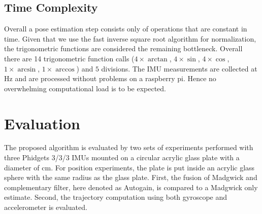 \documentclass[letterpaper, 10 pt, conference]{ieeeconf}  %
\begin{document}
\subsection{Time Complexity}

Overall a pose estimation step consists only of operations that are constant in time. 
Given that we use the fast inverse square root algorithm \cite{FastInvSqrt} for normalization, the trigonometric functions are considered the remaining bottleneck.
Overall there are 14 trigonometric function calls ($4\times \arctan$, $4\times\sin$, $4\times\cos$, $1\times \arcsin$, $1\times\arccos$) and $5$ divisions. 
The IMU measurements are collected at \unit[125]{Hz} and are processed without problems on a raspberry pi.
Hence no overwhelming computational load is to be expected.

 
 

\section{Evaluation}
The proposed algorithm is evaluated by two sets of experiments performed with three Phidgets 3/3/3 IMUs mounted on a circular acrylic glass plate with a diameter of \unit[29]{cm}.
For position experiments, the plate is put inside an acrylic glass sphere with the same radius as the glass plate.
First, the fusion of Madgwick and complementary filter, here denoted as Autogain, is compared to a Madgwick only estimate. Second, the trajectory computation using both gyroscope and accelerometer is evaluated.
\end{document}

